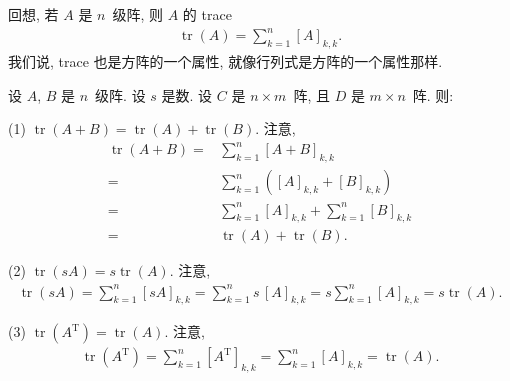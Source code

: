 \documentclass[../libro.tex]{subfiles}
\begin{document}
\begin{example}
    回想, 若 \(A\) 是 \(n\)~级阵, 则 \(A\) 的 trace
    \begin{align*}
        \operatorname{tr} {(A)} = \sum_{k = 1}^{n} {[A]_{k,k}}.
    \end{align*}
    我们说, trace 也是方阵的一个属性,
    就像行列式是方阵的一个属性那样.

    设 \(A\), \(B\) 是 \(n\)~级阵.
    设 \(s\) 是数.
    设 \(C\) 是 \(n \times m\)~阵,
    且 \(D\) 是 \(m \times n\)~阵.
    则:

    (1)
    \(\operatorname{tr} {(A + B)}
    = \operatorname{tr} {(A)} + \operatorname{tr} {(B)}\).
    注意,
    \begin{align*}
        \operatorname{tr} {(A + B)}
        = {} &
        \sum_{k = 1}^{n} {[A + B]_{k,k}}
        \\
        = {} &
        \sum_{k = 1}^{n} {([A]_{k,k} + [B]_{k,k})}
        \\
        = {} &
        \sum_{k = 1}^{n} {[A]_{k,k}}
        + \sum_{k = 1}^{n} {[B]_{k,k}}
        \\
        = {} &
        \operatorname{tr} {(A)}
        + \operatorname{tr} {(B)}.
    \end{align*}

    (2)
    \(\operatorname{tr} {(s A)} = s \operatorname{tr} {(A)}\).
    注意,
    \begin{align*}
        \operatorname{tr} {(s A)}
        = \sum_{k = 1}^{n} {[s A]_{k,k}}
        = \sum_{k = 1}^{n} {s\, [A]_{k,k}}
        = s \sum_{k = 1}^{n} {[A]_{k,k}}
        = s \operatorname{tr} {(A)}.
    \end{align*}

    (3)
    \(\operatorname{tr} {(A^{\mathrm{T}})} = \operatorname{tr} {(A)}\).
    注意,
    \begin{align*}
        \operatorname{tr} {(A^{\mathrm{T}})}
        = \sum_{k = 1}^{n} {[A^{\mathrm{T}}]_{k,k}}
        = \sum_{k = 1}^{n} {[A]_{k,k}}
        = \operatorname{tr} {(A)}.
    \end{align*}


\end{example}
\end{document}
